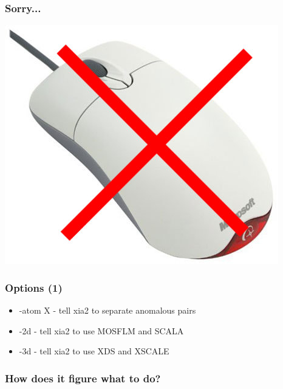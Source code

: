 \documentclass[slides,compress]{beamer}
\begin{document}
\begin{frame}
\frametitle{Sorry...}
\begin{center}
\includegraphics[scale=0.25]{figures/no-mouse.jpg}
\end{center}
\end{frame}

\begin{frame}
\frametitle{Options (1)}
\begin{itemize}
\item{-atom X - tell xia2 to separate anomalous pairs}
\item{-2d - tell xia2 to use MOSFLM and SCALA}
\item{-3d - tell xia2 to use XDS and XSCALE}
\end{itemize}
\end{frame}

\begin{frame}
\frametitle{How does it figure what to do?}
\begin{itemize}
\end{itemize}
\end{frame}
\end{document}
